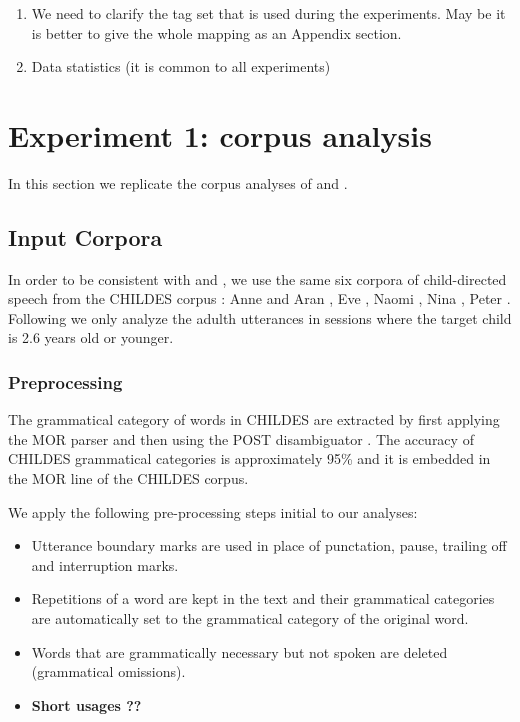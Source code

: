 \begin{enumerate}
\item We need to clarify the tag set that is used during the
  experiments. May be it is better to give the whole mapping as an
  Appendix section.
\item Data statistics (it is common to all experiments)
\end{enumerate}
\section{Experiment 1: corpus analysis}
In this section we replicate the corpus analyses of \cite{20674613}
and \cite{Mintz200391}.  

\subsection{Input Corpora}

In order to be consistent with \cite{20674613} and \cite{Mintz200391},
we use the same six corpora of child-directed speech from the CHILDES
corpus \citep*{macwhinney2000childes}: Anne and Aran
\citep*{theakston2001role}, Eve \citep*{JCL:1765112}, Naomi
\citep*{sachs1983talking}, Nina \citep*{suppes1974semantics}, Peter
\citep*{Bloom1974380, bloom1975structure}.  Following
\cite{Mintz200391} we only analyze the adulth utterances in sessions
where the target child is 2.6 years old or younger.

\subsubsection{Preprocessing}

The grammatical category of words in CHILDES are extracted by first
applying the MOR parser \citep*{macwhinney2000childes} and then using
the POST disambiguator \citep*{sagae2004automatic}.  The accuracy of
CHILDES grammatical categories is approximately 95\%
\citep*{parisse2000automatic} and it is embedded in the MOR line of
the CHILDES corpus.

We apply the following pre-processing steps \citep*{20674613} initial
to our analyses:
\begin{itemize}
\item Utterance boundary marks are used in place of punctation, pause,
  trailing off and interruption marks.
\item Repetitions of a word are kept in the text and their grammatical
  categories are automatically set to the grammatical category of the
  original word.
\item Words that are grammatically necessary but not spoken are
  deleted (grammatical omissions).
\item {\bf Short usages ??}
\end{itemize}


